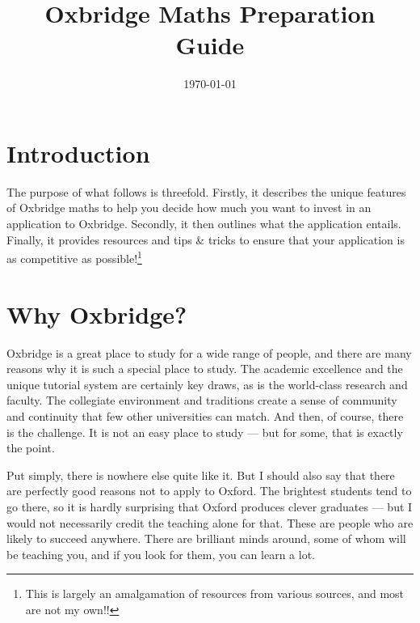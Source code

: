 \documentclass[11pt]{article}
\title{\textbf{Oxbridge Maths Preparation Guide}}
\date{\today}
\newif\ifshowcomments
\newif\ifshowpersonal
\newcommand{\studentname}{Anonymous}
\renewcommand{\studentname}{Aarna}
\newcommand{\comment}[1]{\ifshowcomments\textcolor{myblue}{\textbf{#1}}\fi}
\newcommand{\personal}[1]{\ifshowpersonal\textcolor{myorange}{\emph{#1}}\fi}
\begin{document}
\maketitle

\bigskip

\section{Introduction}
\noindent
The purpose of what follows is threefold. Firstly, it describes the unique features of Oxbridge maths to help you decide how much you want to invest in an application to Oxbridge. Secondly, it then outlines what the application entails. Finally, it provides resources and tips \& tricks to ensure that your application is as competitive as possible!\footnote{This is largely an amalgamation of resources from various sources, and most are not my own!!}  

\ifshowcomments
To make it more personable, I have added comments specific to you \comment{(\studentname)} in \comment{bold}.
\fi
\ifshowpersonal 
Comments on what my own experience was like are given in \personal{italics}.
\fi


\section{Why Oxbridge?}

Oxbridge is a great place to study for a wide range of people, and there are many reasons why it is such a special place to study. The academic excellence and the unique tutorial system are certainly key draws, as is the world-class research and faculty. The collegiate environment and traditions create a sense of community and continuity that few other universities can match. And then, of course, there is the challenge. It is not an easy place to study --- but for some, that is exactly the point.

Put simply, there is nowhere else quite like it. But I should also say that there are perfectly good reasons not to apply to Oxford. The brightest students tend to go there, so it is hardly surprising that Oxford produces clever graduates --- but I would not necessarily credit the teaching alone for that. These are people who are likely to succeed anywhere. There are brilliant minds around, some of whom will be teaching you, and if you look for them, you can learn a lot.
\end{document}
